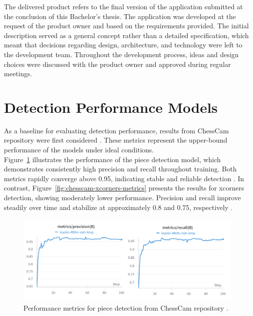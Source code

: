 The delivered product refers to the final version of the application submitted at the conclusion of this Bachelor’s thesis. The application was developed at the request of the product owner and based on the requirements provided. The initial description served as a general concept rather than a detailed specification, which meant that decisions regarding design, architecture, and technology were left to the development team. Throughout the development process, ideas and design choices were discussed with the product owner and approved during regular meetings.

\section{Detection Performance Models}
\label{chesscam-metrics}
As a baseline for evaluating detection performance, results from ChessCam repository were first considered \cite{github:chesscam}. These metrics represent the upper-bound performance of the models under ideal conditions. \\

Figure~\ref{fig:chesscam-piece-metrics} illustrates the performance of the piece detection model, which demonstrates consistently high precision and recall throughout training. Both metrics rapidly converge above 0.95, indicating stable and reliable detection \cite{wandb:piece-detection}. In contrast, Figure~\ref{fig:chesscam-xcorners-metrics} presents the results for xcorners detection, showing moderately lower performance. Precision and recall improve steadily over time and stabilize at approximately 0.8 and 0.75, respectively \cite{wandb:xcorner-detection}. \\

\begin{figure}[H]
\centering
\includegraphics[width=\textwidth]{figures/results/machine-learning/piece-metrics.png}
\caption{Performance metrics for piece detection from ChessCam repository \cite{wandb:piece-detection}.}
\label{fig:chesscam-piece-metrics}
\end{figure}

